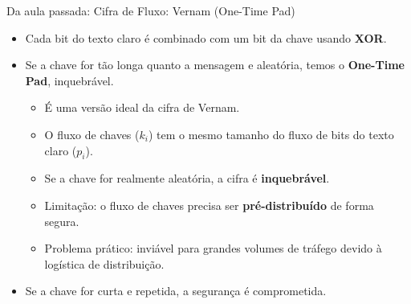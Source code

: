 \begin{frame}{Da aula passada: Cifra de Fluxo: Vernam (One-Time Pad)}

        \begin{itemize}
            \item Cada bit do texto claro é combinado com um bit da chave usando \textbf{XOR}.
            \item Se a chave for tão longa quanto a mensagem e aleatória, temos o \textbf{One-Time Pad}, inquebrável.

            \begin{itemize}
        \item É uma versão ideal da cifra de Vernam.
        \item O fluxo de chaves ($k_i$) tem o mesmo tamanho do fluxo de bits do texto claro ($p_i$).
        \item Se a chave for realmente aleatória, a cifra é \textbf{inquebrável}.
        \item Limitação: o fluxo de chaves precisa ser \textbf{pré-distribuído} de forma segura.
        \item Problema prático: inviável para grandes volumes de tráfego devido à logística de distribuição.
    \end{itemize}

    
            \item Se a chave for curta e repetida, a segurança é comprometida.
        \end{itemize}




\end{frame}



